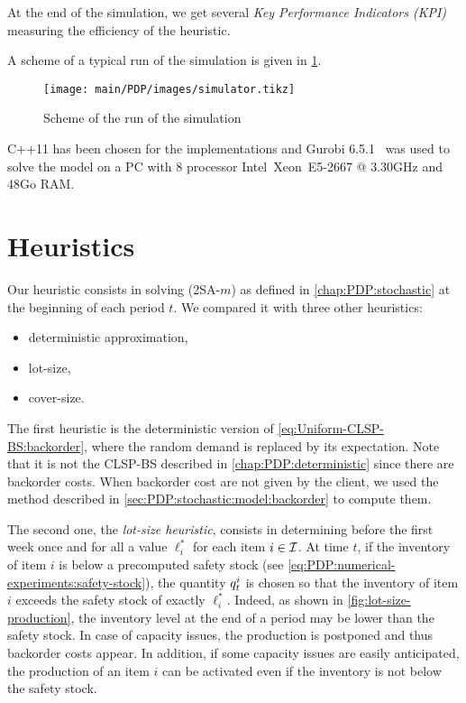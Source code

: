 At the end of the simulation, we get several \emph{Key Performance Indicators (KPI)} measuring the efficiency of the heuristic.


A scheme of a typical run of the simulation is given in \cref{fig:simulator}.

\begin{figure}[h]
  \centering
  \texttt{[image: main/PDP/images/simulator.tikz]}
  \caption{Scheme of the run of the simulation}
  \label{fig:simulator}
\end{figure}


C++11 has been chosen for the implementations and Gurobi 6.5.1~\cite{gurobi} was used to solve the model on a PC with 8 processor Intel\textregistered\ Xeon\texttrademark\ E5-2667 @ 3.30GHz and 48Go RAM.




\section{Heuristics}


Our heuristic consists in solving (2SA-$m$) as defined in \cref{chap:PDP:stochastic} at the beginning of each period $t$.
We compared it with three other heuristics:
\begin{itemize}
  \item deterministic approximation,
  \item lot-size,
  \item cover-size.
\end{itemize}


The first heuristic is the deterministic version of \eqref{eq:Uniform-CLSP-BS:backorder}, where the random demand is replaced by its expectation.
Note that it is not the CLSP-BS described in \cref{chap:PDP:deterministic} since there are backorder costs.
When backorder cost are not given by the client, we used the method described in \cref{sec:PDP:stochastic:model:backorder} to compute them.


The second one, the {\em lot-size heuristic}, consists in determining before the first week once and for all a value $\ell_i^*$ for each item $i\in\mathcal{I}$.
At time $t$, if the inventory of item $i$ is below a precomputed safety stock (see \cref{eq:PDP:numerical-experiments:safety-stock}), the quantity $q_t^i$ is chosen so that the inventory of item $i$ exceeds the safety stock of exactly $\ell_i^*$.
Indeed, as shown in \cref{fig:lot-size-production}, the inventory level at the end of a period may be lower than the safety stock.
In case of capacity issues, the production is postponed and thus backorder costs appear.
In addition, if some capacity issues are easily anticipated, the production of an item $i$ can be activated even if the inventory is not below the safety stock.


